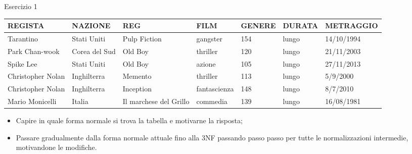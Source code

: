 \begin{frame}{Esercizio 1}
\begin{table}[h]
    \centering
    \scriptsize
    \begin{tabular}{| l | l | l | l | l | l | l |}
        \hline
        \rowcolor{cyan!30} \textbf{REGISTA} & \textbf{NAZIONE} & \textbf{REG} & \textbf{FILM} & \textbf{GENERE} & \textbf{DURATA} & \textbf{METRAGGIO} \\ \hline
        Tarantino & Stati Uniti & Pulp Fiction & gangster & 154 & lungo & 14/10/1994 \\ \hline
        Park Chan-wook & Corea del Sud & Old Boy & thriller & 120 & lungo & 21/11/2003 \\ \hline
        Spike Lee & Stati Uniti & Old Boy & azione & 105 & lungo & 27/11/2013 \\ \hline
        Christopher Nolan & Inghilterra & Memento & thriller & 113 & lungo & 5/9/2000 \\ \hline
        Christopher Nolan & Inghilterra & Inception & fantascienza & 148 & lungo & 8/7/2010 \\ \hline
        Mario Monicelli & Italia & Il marchese del Grillo & commedia & 139 & lungo & 16/08/1981 \\ \hline
    \end{tabular}
\end{table}
\vspace{1cm}
    \begin{itemize}[<+->]
    \item Capire in quale forma normale si trova la tabella e motivarne la risposta;
    \item Passare gradualmente dalla forma normale attuale fino alla 3NF passando passo passo per tutte le normalizzazioni intermedie, motivandone le modifiche.
\end{itemize}

\end{frame}
%
